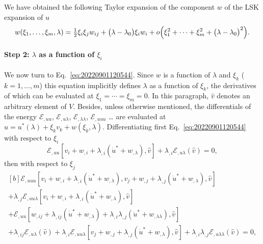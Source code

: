 \documentclass[12pt, final]{scrartcl}
\theoremstyle{definition}
\newcommand{\E}{\mathcal E}
\begin{document}
We have obtained the following Taylor expansion of the component $w$ of the
LSK expansion of $u$
\begin{equation}
  w(\xi_1, \ldots, \xi_m, \lambda) = \tfrac{1}{2} \xi_i \xi_j w_{ij} + \bigl( \lambda - \lambda_0 \bigr) \xi_i w_i + o\Bigl(\xi_1^2 + \cdots + \xi_m^2 + \bigl(\lambda - \lambda_0\bigr)^2\Bigr).
\end{equation}

\paragraph{Step 2: $\lambda$ as a function of $\xi_i$} We now turn to
Eq.~\eqref{eq:20220901120544}. Since $w$ is a function of $\lambda$ and $\xi_k$
($k = 1, \ldots, m$) this equation implicitly defines $\lambda$ as a function of
$\xi_k$, the derivatives of which can be evaluated at $\xi_1 = \cdots = \xi_m =
0$. In this paragraph, $\hat{v}$ denotes an arbitrary element of
$V$. Besides, unless otherwise mentioned, the differentials of the energy
$\E_{,uu}$, $\E_{,u\lambda}$, $\E_{,\lambda\lambda}$, $\E_{,uuu}$ \dots{} are evaluated at
$u = u^\ast(\lambda) + \xi_k v_k + w(\xi_k, \lambda)$. Differentiating first
Eq.~\eqref{eq:20220901120544} with respect to $\xi_i$
\begin{equation}
  \label{eq:20220901121940}
  \E_{,uu}[v_i + w_{,i} + \lambda_{,i} (\dot{u}^\ast + w_{,\lambda}), \hat{v}] + \lambda_{, i} \E_{,u\lambda}(\hat{v}) = 0,
\end{equation}
then with respect to $\xi_j$
\begin{equation}
  \label{eq:20220901125230}
  \begin{gathered}[b]
    \E_{,uuu}[v_i + w_{,i} + \lambda_{,i} (\dot{u}^\ast + w_{,\lambda}), v_j + w_{,j} + \lambda_{,j} (\dot{u}^\ast + w_{,\lambda}), \hat{v}]\\
    + \lambda_{,j}\E_{,uu\lambda}[v_i + w_{,i} + \lambda_{,i} (\dot{u}^\ast + w_{,\lambda}), \hat{v}]\\
    + \E_{,uu}[w_{,ij} + \lambda_{,ij} (\dot{u}^\ast + w_{,\lambda}) + \lambda_{,i}\lambda_{,j} (\ddot{u}^\ast + w_{,\lambda\lambda}), \hat{v}]\\
    + \lambda_{, ij} \E_{,u\lambda}(\hat{v}) + \lambda_{, i} \E_{,uu\lambda}[v_j + w_{,j} + \lambda_{,j} (\dot{u}^\ast + w_{,\lambda}), \hat{v}] + \lambda_{,i} \lambda_{,j} \E_{,u\lambda\lambda}(\hat{v})= 0,
  \end{gathered}
\end{equation}
\end{document}
